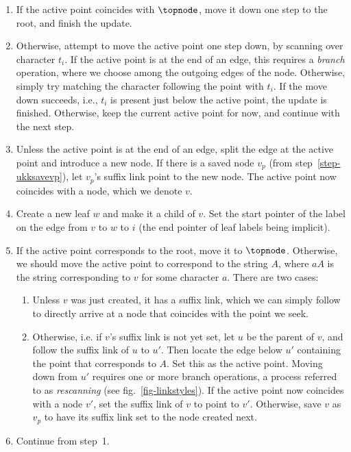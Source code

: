 \documentclass{llncs}
\begin{document}
\begin{enumerate}
\item If the active point coincides with $\topnode$, move it down one step to
  the root, and finish the update.
\item Otherwise, attempt to move the active point one step down, by scanning
  over character $t_i$. If the active point is at the end of an edge, this
  requires a \emph{branch} operation, where we choose among the outgoing
  edges of the node. Otherwise,
  simply try matching the character following the point with $t_i$. If the move down
  succeeds, i.e., $t_i$ is present just below the active point, the update
  is finished. Otherwise, keep the current active point for now, and continue with
  the next step.
\item\label{step-ukksplit} Unless the active point is at the end of an edge,
  split the edge at the active point and introduce a new node. If there is a
  saved node $v_p$ (from step~\ref{step-ukksavevp}), let $v_p$'s suffix link
  point to the new node. The active point now coincides with a node, which we
  denote $v$.
\item Create a new leaf $w$ and make it a child of $v$. Set the start pointer
  of the label on the edge from $v$ to $w$ to $i$ (the end pointer of leaf
  labels being implicit).
\item If the active point corresponds to the root, move it to
  $\topnode$. Otherwise, we should move the active point to correspond
  to the string $A$, where $aA$ is the string corresponding to $v$ for some character
  $a$. There are two cases:
  \begin{enumerate}
  \item Unless $v$ was just created, it has a suffix link, which
    we can simply follow to directly arrive at a node that coincides with the
    point we seek.
  \item\label{step-ukkrescan} Otherwise, i.e. if $v$'s suffix link is not yet set, let $u$ be
    the parent of $v$, and follow the suffix link of $u$ to $u'$. Then locate
    the edge below $u'$ containing the point that corresponds to $A$. Set this
    as the active point. Moving down from $u'$ requires one or more branch
    operations, a process referred to as \emph{rescanning} (see fig.~\ref{fig-linkstyles}). If
    the active point now coincides with a node $v'$, set the suffix link of $v$
    to point to $v'$. Otherwise, save $v$ as $v_p$ to have its suffix link set
    to the node created next.\label{step-ukksavevp}
  \end{enumerate}
\item Continue from step~1.
\end{enumerate}
\end{document}

